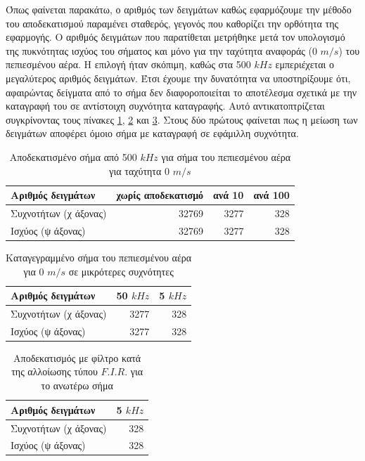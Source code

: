 \documentclass[breaklines=true, 12pt]{article}
\begin{document}
\begin{enumerate}
Όπως φαίνεται παρακάτω, ο αριθμός των δειγμάτων καθώς
εφαρμόζουμε την μέθοδο του αποδεκατισμού παραμένει σταθερός, γεγονός που
καθορίζει την ορθότητα της εφαρμογής. Ο αριθμός δειγμάτων που παρατίθεται
μετρήθηκε μετά τον υπολογισμό της πυκνότητας ισχύος του σήματος και μόνο
για την ταχύτητα αναφοράς (0 \(m/s\)) του πεπιεσμένου αέρα. Η επιλογή
ήταν σκόπιμη, καθώς στα 500 \(kHz\) εμπεριέχεται ο μεγαλύτερος αριθμός
δειγμάτων. Έτσι έχουμε την δυνατότητα να υποστηρίξουμε ότι, αφαιρώντας
δείγματα από το σήμα δεν διαφοροποιείται το αποτέλεσμα σχετικά με την
καταγραφή του σε αντίστοιχη συχνότητα καταγραφής. Αυτό αντικατοπτρίζεται
συγκρίνοντας τους πίνακες \ref{some_ref}, \ref{rec_low_fs_ref} και \ref{dec_fir_ref}. Στους
δύο πρώτους φαίνεται πως η μείωση των δειγμάτων αποφέρει όμοιο σήμα με
καταγραφή σε εφάμιλλη συχνότητα.

\begin{table}[htbp]
\caption{\label{some_ref}Αποδεκατισμένο σήμα από 500 \(kHz\) για σήμα του πεπιεσμένου αέρα για ταχύτητα 0 \(m/s\)}
\centering
\begin{tabular}{lrrr}
\hline
Αριθμός δειγμάτων & χωρίς αποδεκατισμό & ανά 10 & ανά 100\\[0pt]
\hline
Συχνοτήτων (χ άξονας) & 32769 & 3277 & 328\\[0pt]
Ισχύος (ψ άξονας) & 32769 & 3277 & 328\\[0pt]
\end{tabular}
\end{table}

\begin{table}[htbp]
\caption{\label{rec_low_fs_ref}Καταγεγραμμένο σήμα του πεπιεσμένου αέρα για 0 \(m/s\) σε μικρότερες συχνότητες}
\centering
\begin{tabular}{lrr}
Αριθμός δειγμάτων & 50 \(kHz\) & 5 \(kHz\)\\[0pt]
\hline
Συχνοτήτων (χ άξονας) & 3277 & 328\\[0pt]
Ισχύος (ψ άξονας) & 3277 & 328\\[0pt]
\end{tabular}
\end{table}

\begin{table}[htbp]
\caption{\label{dec_fir_ref}Αποδεκατισμός με φίλτρο κατά της αλλοίωσης τύπου \(F.I.R.\) για το ανωτέρω σήμα}
\centering
\begin{tabular}{lr}
Αριθμός δειγμάτων & 5 \(kHz\)\\[0pt]
\hline
\hline
Συχνοτήτων (χ άξονας) & 328\\[0pt]
Ισχύος (ψ άξονας) & 328\\[0pt]
\end{tabular}
\end{table}


\end{enumerate}
\end{document}
